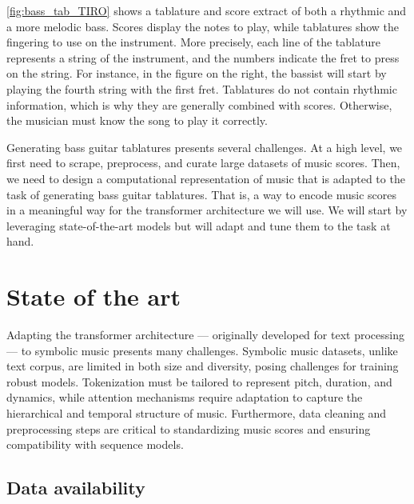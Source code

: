 \documentclass[11pt, a4paper]{article}
\begin{document}
\ref{fig:bass_tab_TIRO} shows a tablature and score extract of both a rhythmic and a more melodic bass.
Scores display the notes to play, while tablatures show the fingering to use on the instrument.
More precisely, each line of the tablature represents a string of the instrument, and the numbers indicate the fret to press on the string.
For instance, in the figure on the right, the bassist will start by playing the fourth string with the first fret.
Tablatures do not contain rhythmic information, which is why they are generally combined with scores.
Otherwise, the musician must know the song to play it correctly.


Generating bass guitar tablatures presents several challenges.
At a high level, we first need to scrape, preprocess, and curate large datasets of music scores.
Then, we need to design a computational representation of music that is adapted to the task of generating bass guitar tablatures.
That is, a way to encode music scores in a meaningful way for the transformer architecture we will use.
We will start by leveraging state-of-the-art models but will adapt and tune them to the task at hand.


\section*{State of the art}

Adapting the transformer architecture — originally developed for text processing — to symbolic music presents many challenges.
Symbolic music datasets, unlike text corpus, are limited in both size and diversity, posing challenges for training robust models\cite{leNaturalLanguageProcessing2024}.
Tokenization must be tailored to represent pitch, duration, and dynamics, while attention mechanisms require adaptation to capture the hierarchical and temporal structure of music.
Furthermore, data cleaning and preprocessing steps are critical to standardizing music scores and ensuring compatibility with sequence models.


\subsection*{Data availability}
\end{document}
